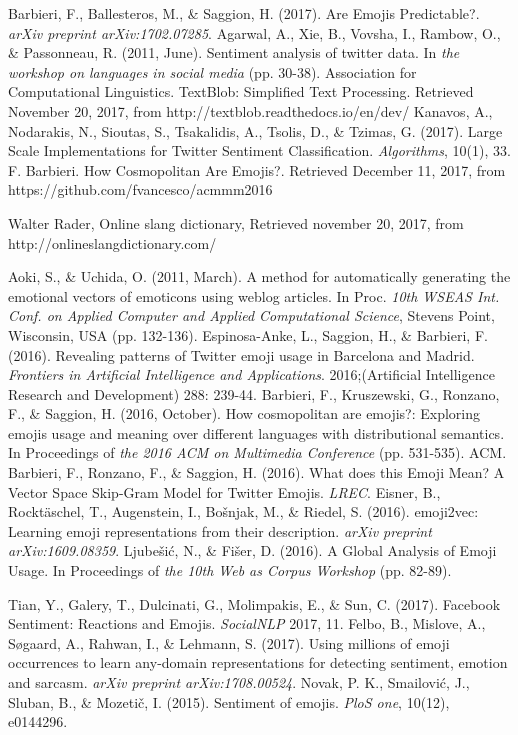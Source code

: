\documentclass[english, table, latin9]{article}
\begin{document}
\clearpage
\footnotesize
\begin{thebibliography}{99}
 Barbieri, F., Ballesteros, M., \& Saggion, H. (2017). Are Emojis Predictable?. \emph{arXiv preprint arXiv:1702.07285}.
 Agarwal, A., Xie, B., Vovsha, I., Rambow, O., \& Passonneau, R. (2011, June). Sentiment analysis of twitter data. In \emph{the workshop on languages in social media} (pp. 30-38). Association for Computational Linguistics.
 TextBlob: Simplified Text Processing. Retrieved November 20, 2017, from http://textblob.readthedocs.io/en/dev/
 Kanavos, A., Nodarakis, N., Sioutas, S., Tsakalidis, A., Tsolis, D., \& Tzimas, G. (2017). Large Scale Implementations for Twitter Sentiment Classification. \emph{Algorithms}, 10(1), 33.
 F. Barbieri. How Cosmopolitan Are Emojis?. Retrieved December 11, 2017, from https://github.com/fvancesco/acmmm2016

 Walter Rader, Online slang dictionary, Retrieved november 20, 2017, from http://onlineslangdictionary.com/

 Aoki, S., \& Uchida, O. (2011, March). A method for automatically generating the emotional vectors of emoticons using weblog articles. In Proc. \emph{10th WSEAS Int. Conf. on Applied Computer and Applied Computational Science}, Stevens Point, Wisconsin, USA (pp. 132-136).
 Espinosa-Anke, L., Saggion, H., \& Barbieri, F. (2016). Revealing patterns of Twitter emoji usage in Barcelona and Madrid. \emph{Frontiers in Artificial Intelligence and Applications}. 2016;(Artificial Intelligence Research and Development) 288: 239-44.
 Barbieri, F., Kruszewski, G., Ronzano, F., \& Saggion, H. (2016, October). How cosmopolitan are emojis?: Exploring emojis usage and meaning over different languages with distributional semantics. In Proceedings of \emph{the 2016 ACM on Multimedia Conference} (pp. 531-535). ACM.
 Barbieri, F., Ronzano, F., \& Saggion, H. (2016). What does this Emoji Mean? A Vector Space Skip-Gram Model for Twitter Emojis. \emph{LREC}.
 Eisner, B., Rocktäschel, T., Augenstein, I., Bošnjak, M., \& Riedel, S. (2016). emoji2vec: Learning emoji representations from their description. \emph{arXiv preprint arXiv:1609.08359}.
 Ljubešić, N., \& Fišer, D. (2016). A Global Analysis of Emoji Usage. In Proceedings of \emph{the 10th Web as Corpus Workshop} (pp. 82-89).

 Tian, Y., Galery, T., Dulcinati, G., Molimpakis, E., \& Sun, C. (2017). Facebook Sentiment: Reactions and Emojis. \emph{SocialNLP} 2017, 11.
 Felbo, B., Mislove, A., Søgaard, A., Rahwan, I., \& Lehmann, S. (2017). Using millions of emoji occurrences to learn any-domain representations for detecting sentiment, emotion and sarcasm. \emph{arXiv preprint arXiv:1708.00524}.
 Novak, P. K., Smailović, J., Sluban, B., \& Mozetič, I. (2015). Sentiment of emojis. \emph{PloS one}, 10(12), e0144296.
\end{thebibliography}
\end{document}
